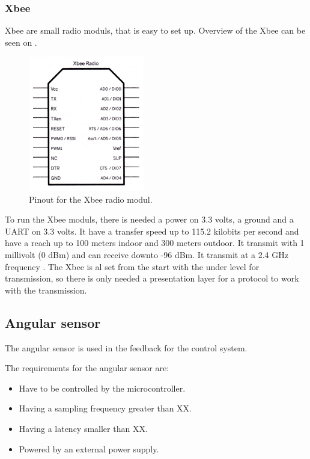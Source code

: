 \subsubsection{Xbee}
Xbee are small radio moduls, that is easy to set up. Overview of the Xbee can be seen on \figref{}.

\begin{figure}[H]
	\includegraphics[width=0.45\textwidth]{figures/XbeeIO}
		\caption{Pinout for the Xbee radio modul.} %
	\label{Xbeepinout}
\end{figure}

To run the Xbee moduls, there is needed a power on 3.3 volts, a ground and a UART on 3.3 volts. It have a transfer speed up to 115.2 kilobits per second and have a reach up to 100 meters indoor and 300 meters outdoor. It transmit with 1 millivolt (0 dBm) and can receive downto -96 dBm. It transmit at a 2.4 GHz frequency . The Xbee is al set from the start with the under level for transmission, so there is only needed a presentation layer for a protocol to work with the transmission.



\subsection{Angular sensor}
The angular sensor is used in the feedback for the control system.

The requirements for the angular sensor are:
\begin{itemize}
\item Have to be controlled by the microcontroller.
\item Having a sampling frequency greater than XX. 
\item Having a latency smaller than XX. 
\item Powered by an external power supply.
\end{itemize}

